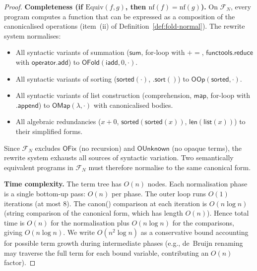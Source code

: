 \begin{proof}
\textbf{Completeness (if $\mathrm{Equiv}(f,g)$, then
$\mathrm{nf}(f) = \mathrm{nf}(g)$).}
On $\mathcal{F}_N$, every program computes a function that can be
expressed as a composition of the canonicalised operations (item~(ii)
of Definition~\ref{def:fold-normal}).  The rewrite system normalises:
\begin{itemize}
  \item All syntactic variants of summation ($\mathsf{sum}$,
    for-loop with $\mathsf{+=}$, $\mathsf{functools.reduce}$ with
    $\mathsf{operator.add}$) to $\mathsf{OFold}(\mathsf{iadd}, 0,
    \cdot)$.
  \item All syntactic variants of sorting ($\mathsf{sorted}(\cdot)$,
    $\mathsf{.sort}()$) to $\mathsf{OOp}(\mathsf{sorted}, \cdot)$.
  \item All syntactic variants of list construction (comprehension,
    $\mathsf{map}$, for-loop with $\mathsf{.append}$) to
    $\mathsf{OMap}(\lambda, \cdot)$ with canonicalised bodies.
  \item All algebraic redundancies ($x + 0$, $\mathsf{sorted}(
    \mathsf{sorted}(x))$, $\mathsf{len}(\mathsf{list}(x))$) to
    their simplified forms.
\end{itemize}
Since $\mathcal{F}_N$ excludes $\mathsf{OFix}$ (no recursion) and
$\mathsf{OUnknown}$ (no opaque terms), the rewrite system exhausts
all sources of syntactic variation.  Two semantically equivalent
programs in $\mathcal{F}_N$ must therefore normalise to the same
canonical form.

\textbf{Time complexity.}
The term tree has $O(n)$ nodes.  Each normalisation phase is a
single bottom-up pass: $O(n)$ per phase.  The outer loop runs
$O(1)$ iterations (at most 8).  The canon() comparison at each
iteration is $O(n \log n)$ (string comparison of the canonical form,
which has length $O(n)$).  Hence total time is $O(n)$ for the
normalisation plus $O(n \log n)$ for the comparisons, giving
$O(n \log n)$.  We write $O(n^2 \log n)$ as a conservative bound
accounting for possible term growth during intermediate phases
(e.g., de~Bruijn renaming may traverse the full term for each
bound variable, contributing an $O(n)$ factor).
\end{proof}

